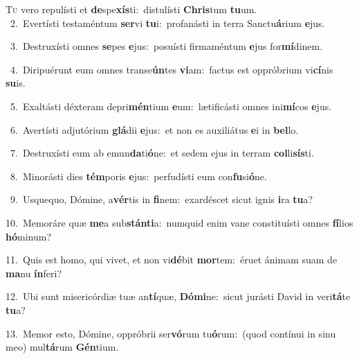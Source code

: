 \lettrine{\initial\textcolor{\initialcolor}{T}}{u} vero repulísti et \textbf{de}\-spe\-\textbf{xís}\-ti:~\star distulísti \textbf{Chris}\-tum \textbf{tu}\-um.\\
{\numbfont\textcolor{\numbcolor}{~2.}}~Evertísti testaméntum \textbf{ser}\-vi \textbf{tu}\-i:~\star profanásti in terra Sanctu\-\textbf{á}\-rium \textbf{e}\-jus.\par
{\numbfont\textcolor{\numbcolor}{~3.}}~Destruxísti omnes \textbf{se}\-pes \textbf{e}\-jus:~\star posuísti firmaméntum \textbf{e}\-jus for\-\textbf{mí}\-dinem.\par
{\numbfont\textcolor{\numbcolor}{~4.}}~Diripuérunt eum omnes transe\-\textbf{ún}\-tes \textbf{vi}\-am:~\star factus est oppróbrium vi\-\textbf{cí}\-nis \textbf{su}\-is.\par
{\numbfont\textcolor{\numbcolor}{~5.}}~Exaltásti déxteram depri\-\textbf{mén}\-tium \textbf{e}\-um:~\star lætificásti omnes ini\-\textbf{mí}\-cos \textbf{e}\-jus.\par
{\numbfont\textcolor{\numbcolor}{~6.}}~Avertísti adjutórium \textbf{glá}\-dii \textbf{e}\-jus:~\star et non es auxiliátus \textbf{e}\-i in \textbf{bel}\-lo.\par
{\numbfont\textcolor{\numbcolor}{~7.}}~Destruxísti eum ab emun\-\textbf{da}\-ti\-\textbf{ó}\-ne:~\star et sedem ejus in terram \textbf{col}\-li\-\textbf{sís}\-ti.\par
{\numbfont\textcolor{\numbcolor}{~8.}}~Minorásti dies \textbf{tém}\-poris \textbf{e}\-jus:~\star perfudísti eum con\-\textbf{fu}\-si\-\textbf{ó}\-ne.\par
{\numbfont\textcolor{\numbcolor}{~9.}}~Usquequo, Dómine, a\-\textbf{vér}\-tis in \textbf{fi}\-nem:~\star exardéscet sicut ignis \textbf{i}\-ra \textbf{tu}\-a?\par
{\numbfont\textcolor{\numbcolor}{10.}}~Memoráre quæ \textbf{me}\-a sub\-\textbf{stán}\-\textbf{ti}a:~\star numquid enim vane constituísti omnes \textbf{fí}\-lios \textbf{hó}\-minum?\par
{\numbfont\textcolor{\numbcolor}{11.}}~Quis est homo, qui vivet, et non vi\-\textbf{dé}\-bit \textbf{mor}\-tem:~\star éruet ánimam suam de \textbf{ma}\-nu \textbf{ín}\-feri?\par
{\numbfont\textcolor{\numbcolor}{12.}}~Ubi sunt misericórdiæ tuæ an\-\textbf{tí}\-quæ, \textbf{Dó}\-\textbf{mi}ne:~\star sicut jurásti David in veri\-\textbf{tá}\-te \textbf{tu}\-a?\par
{\numbfont\textcolor{\numbcolor}{13.}}~Memor esto, Dómine, oppróbrii ser\-\textbf{vó}\-rum tu\-\textbf{ó}\-rum:~\star (quod contínui in sinu meo) mul\-\textbf{tá}\-rum \textbf{Gén}\-tium.\par
